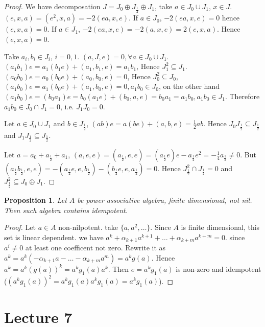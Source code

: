 \documentclass{article}
\newtheorem{proposition}[theorem]{Proposition}
\begin{document}
\begin{proof} 
We have decomposation $ J=J_0 \oplus J_{\frac{1}{2}} \oplus J_1  $, take $ a \in J_0 \cup J_1 $, $ x \in J $. $ (e,x,a)=(e^2,x,a)=-2(ea,x,e) $. If $ a \in J_0 $, $ -2(ea,x,e)=0 $ hence $ (e,x,a)=0 $. If $ a \in J_1 $, $ -2(ea,x,e)=-2(a,x,e)=2(e,x,a) $. Hence $ (e,x,a)=0 $.  

Take $ a_i, b_i \in J_i $, $ i=0,1 $. $ (a,J,e)=0, \forall a \in J_0 \cup J_1 $. $ (a_1b_1)e=a_1(b_1e)+(a_1,b_1,e)=a_1b_1 $, Hence $ J_1^2 \subseteq J_1 $. $ (a_0b_0)e=a_0(b_0e)+(a_0,b_0,e)=0 $, Hence $ J_0^2 \subseteq J_0 $, $ (a_1b_0)e=a_1(b_0e)+(a_1,b_0,e)=0 ,a_1b_0 \in J_0$, on the other hand $ (a_1b_0)e=(b_0a_1)e=b_0(a_1e)+(b_0,a,e)=b_0a_1=a_1b_0, a_1b_0 \in J_1 $. Therefore $ a_1b_0 \in J_0 \cap J_1 =0 $, i.e. $ J_1J_0=0 $.  

Let $ a \in J_0 \cup J_1 $ and $ b \in J_{\frac{1}{2}} $, $ (ab)e=a(be)+(a,b,e) =\frac{1}{2}ab$. Hence $ J_0J_{\frac{1}{2}} \subseteq J_{\frac{1}{2}} $ and $ J_1J_{\frac{1}{2}} \subseteq J_{\frac{1}{2}} $.

Let  $ a=a_0+a_{\frac{1}{2}}+a_1 $, $ (a,e,e)=(a_{\frac{1}{2}},e,e) =(a_{\frac{1}{2}}e)e-a_{\frac{1}{2}}e^2=-\frac{1}{4}a_{\frac{1}{2}} \neq 0$. But $ (a_{\frac{1}{2}} b_{\frac{1}{2}},e,e)=-(a_{\frac{1}{2}}e,e,b_{\frac{1}{2}}) -(b_{\frac{1}{2}}e,e,a_{\frac{1}{2}}) =0$. Hence $ J_{\frac{1}{2}} ^2 \cap J_{\frac{1}{2}} =0 $ and $ J_{\frac{1}{2}} ^2 \subseteq J_0 \oplus J_1 $.  
\end{proof}

\begin{proposition}
Let $ A $ be power associative algebra, finite dimensional, not nil. Then such algebra contains idempotent.  
\end{proposition}

\begin{proof} 
Let $ a \in A $ non-nilpotent. take $ \{a,a^2, \ldots\} $. Since $ A $ is finite dimensional, this set is linear dependent. we have $ a^k+\alpha_{k+1}a^{k+1}+ \ldots + \alpha_{k+m}a^{k+m} =0$. since $ a^i \neq 0 $  at least one coefficent not zero. Rewrite it as $ a^k=a^k(-\alpha_{k+1}a- \ldots -\alpha_{k+m}a^m) =a^kg(a)$. Hence $ a^k=a^k(g(a))^k =a^k g_1(a) a^k$. Then $ e=a^kg_1(a) $ is non-zero and idempotent ($ (a^kg_1(a))^2=a^kg_1(a)a^kg_1(a)=a^kg_1(a) $).        
\end{proof}

\section{Lecture 7}
\end{document}

